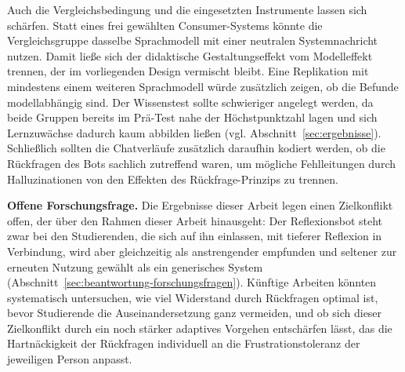 Auch die Vergleichsbedingung und die eingesetzten Instrumente lassen sich schärfen. Statt eines frei
gewählten Consumer-Systems könnte die Vergleichsgruppe dasselbe Sprachmodell mit einer neutralen
Systemnachricht nutzen. Damit ließe sich der didaktische Gestaltungseffekt vom Modelleffekt trennen,
der im vorliegenden Design vermischt bleibt. Eine Replikation mit mindestens einem weiteren
Sprachmodell würde zusätzlich zeigen, ob die Befunde modellabhängig sind. Der Wissenstest sollte
schwieriger angelegt werden, da beide Gruppen bereits im Prä-Test nahe der Höchstpunktzahl lagen und
sich Lernzuwächse dadurch kaum abbilden ließen (vgl. Abschnitt~\ref{sec:ergebnisse}). Schließlich
sollten die Chatverläufe zusätzlich daraufhin kodiert werden, ob die Rückfragen des Bots sachlich
zutreffend waren, um mögliche Fehlleitungen durch Halluzinationen von den Effekten des
Rückfrage-Prinzips zu trennen.

\textbf{Offene Forschungsfrage.} Die Ergebnisse dieser Arbeit legen einen Zielkonflikt offen, der
über den Rahmen dieser Arbeit hinausgeht: Der Reflexionsbot steht zwar bei den Studierenden, die
sich auf ihn einlassen, mit tieferer Reflexion in Verbindung, wird aber gleichzeitig als anstrengender
empfunden und seltener zur erneuten Nutzung gewählt als ein generisches System
(Abschnitt~\ref{sec:beantwortung-forschungsfragen}). Künftige Arbeiten könnten systematisch
untersuchen, wie viel Widerstand durch Rückfragen optimal ist, bevor Studierende die
Auseinandersetzung ganz vermeiden, und ob sich dieser Zielkonflikt durch ein noch stärker adaptives
Vorgehen entschärfen lässt, das die Hartnäckigkeit der Rückfragen individuell an die
Frustrationstoleranz der jeweiligen Person anpasst.
